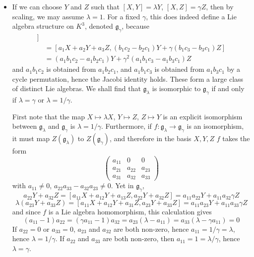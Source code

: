 \begin{itemize}
    \item If we can choose $Y$ and $Z$ such that $[X,Y] = \lambda Y$, $[X,Z] = \gamma Z$, then by scaling, we may assume $\lambda = 1$. For a fixed $\gamma$, this does indeed define a Lie algebra structure on $K^3$, denoted $\mathfrak{g}_\gamma$, because
    \begin{align*}
        [a_1X + a_2Y& + a_3Z, [b_1X + b_2Y + b_3Z, c_1X + c_2Y + c_3Z]]\\
        &= [a_1X + a_2Y + a_3Z, (b_1c_2 - b_2c_1) Y + \gamma (b_1 c_3 - b_3c_1) Z]\\
        &= (a_1b_1c_2 - a_1 b_2c_1) Y + \gamma^2 (a_1 b_1c_3 - a_1 b_3 c_1) Z
    \end{align*}
    and $a_1b_1c_2$ is obtained from $a_1b_2c_1$, and $a_1b_1c_3$ is obtained from $a_1b_3c_1$ by a cycle permutation, hence the Jacobi identity holds. These form a large class of distinct Lie algebras. We shall find that $\mathfrak{g}_\lambda$ is isomorphic to $\mathfrak{g}_\gamma$ if and only if $\lambda = \gamma$ or $\lambda = 1/\gamma$.

    First note that the map $X \mapsto \lambda X$, $Y \mapsto Z$, $Z \mapsto Y$ is an explicit isomorphism between $\mathfrak{g}_\lambda$ and $\mathfrak{g}_\gamma$ is $\lambda = 1/\gamma$. Furthermore, if $f: \mathfrak{g}_\lambda \to \mathfrak{g}_\gamma$ is an isomorphism, it must map $Z(\mathfrak{g}_\lambda)$ to $Z(\mathfrak{g}_\gamma)$, and therefore in the basis $X,Y,Z$ $f$ takes the form
    \[ \begin{pmatrix} a_{11} & 0 & 0 \\ a_{21} & a_{22} & a_{23} \\ a_{31} & a_{32} & a_{33} \end{pmatrix} \]
    with $a_{11} \neq 0$, $a_{22} a_{33} - a_{32} a_{23} \neq 0$. Yet in $\mathfrak{g}_\gamma$,
    \[ a_{22}Y + a_{32}Z = [a_{11}X + a_{12}Y + a_{13}Z, a_{22}Y + a_{32}Z] = a_{11}a_{22}Y + a_{11}a_{32} \gamma Z \]
    \[ \lambda (a_{23}Y + a_{33}Z) = [a_{11}X + a_{12}Y + a_{31}Z, a_{23}Y + a_{33}Z] = a_{11}a_{23}Y + a_{11}a_{33} \gamma Z \]
    and since $f$ is a Lie algebra homomorphism, this calculation gives
    \[ (a_{11} - 1)a_{22} = (\gamma a_{11} - 1) a_{32} = a_{23}(\lambda - a_{11}) = a_{33}(\lambda - \gamma a_{11}) = 0 \]
    If $a_{22} = 0$ or $a_{33} = 0$, $a_{23}$ and $a_{32}$ are both non-zero, hence $a_{11} = 1/\gamma = \lambda$, hence $\lambda = 1/\gamma$. If $a_{22}$ and $a_{33}$ are both non-zero, then $a_{11} = 1 = \lambda/\gamma$, hence $\lambda = \gamma$.


\end{itemize}
